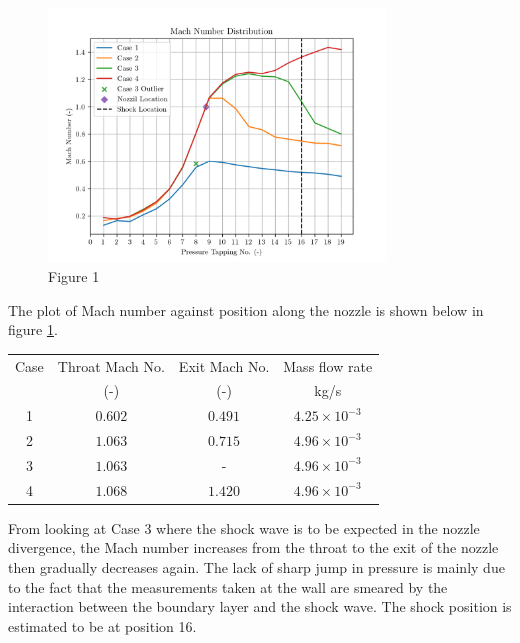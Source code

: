 \documentclass[8pt]{article}
\begin{document}
\begin{figure}[H]
    \centering
    \includegraphics[width=0.8\textwidth]{mach_number_distribution_corrected.png}
    \caption{Figure 1}
    \label{fig:figure5}
\end{figure}
The plot of Mach number against position along the nozzle is shown below in figure \ref{fig:figure5}.

\begin{center}
    \begin{tabular}{|c|c|c|c|}
    \hline 
    Case & Throat Mach No.  & Exit Mach No. & Mass flow rate\\
     & (-) & (-) & kg/s \\
    \hline 
    1 & $0.602$ & $0.491$ & $ 4.25 \times 10^{-3} $ \\
    2 & $1.063$ & $0.715$ & $ 4.96 \times 10^{-3} $ \\
    3 & $1.063$ & - & $ 4.96 \times 10^{-3} $ \\
    4 & $1.068$ & $1.420$ & $ 4.96 \times 10^{-3} $ \\
    \hline
    \end{tabular}
    \label{tab:1}
\end{center}

From looking at Case 3 where the shock wave is to be expected in the nozzle divergence, the Mach number increases from the throat to the exit of the nozzle then gradually decreases again.
The lack of sharp jump in pressure is mainly due to the fact that the measurements taken at the wall are smeared by the interaction between the boundary layer and the shock wave.
The shock position is estimated to be at position 16.
\end{document}
